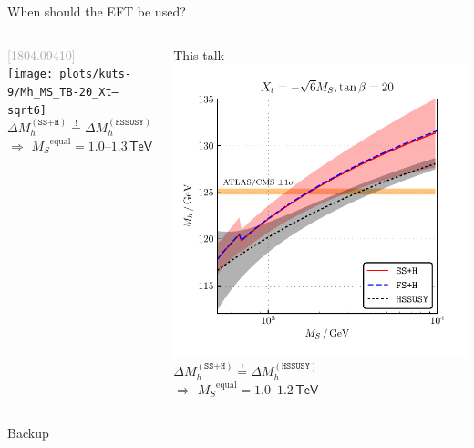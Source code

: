 \documentclass[hyperref={pdfpagelabels=false},ngerman]{beamer}
\newcommand{\eh}[1]{\,\mathsf{#1}}
\newcommand{\TeV}{\eh{TeV}}
\newcommand{\MS}{\ensuremath{M_S}}
\newcommand{\bigcite}[1]{\textcolor{darkgray}{[#1]}}
\newcommand{\DMh}{\ensuremath{\Delta M_h^{(\texttt{SS+H})}}}
\newcommand{\DMhHSSUSY}{\ensuremath{\Delta M_h^{(\HSSUSY)}}}
\def\HSSUSY{\texttt{HSSUSY}}
\begin{document}
\begin{frame}{When should the EFT be used?}
  \begin{columns}
    \begin{column}{0.5\textwidth}
      \centering
      \bigcite{1804.09410}\\
      \texttt{[image: plots/kuts-9/Mh\_MS\_TB-20\_Xt--sqrt6]}\\
      $\DMh \overset{!}{=} \DMhHSSUSY$\\[0.5em]
      $\Rightarrow$ $\MS^{\text{equal}} = 1.0$--$1.3\TeV$
    \end{column}
    \begin{column}{0.5\textwidth}
      \centering
      This talk\\
      \includegraphics[width=\textwidth]{plots/kuts-10/DMh_MS_combined}\\
      $\DMh \overset{!}{=} \DMhHSSUSY$\\[0.5em]
      $\Rightarrow$ $\MS^{\text{equal}} = 1.0$--$1.2\TeV$
    \end{column}
  \end{columns}
\end{frame}

\begin{frame}[noframenumbering]
  \begin{center}
    \Huge Backup
  \end{center}
\end{frame}
\end{document}

